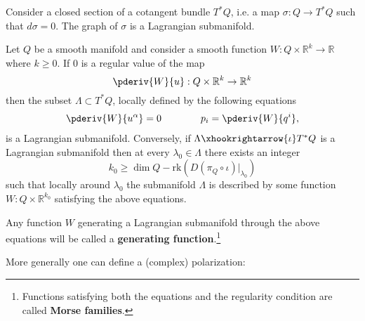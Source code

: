     \begin{example}\label{diff:closed_section_submanifold}
        Consider a closed section of a cotangent bundle $T^*Q$, i.e. a map $\sigma:Q\rightarrow T^*Q$ such that $d\sigma=0$. The graph of $\sigma$ is a Lagrangian submanifold.
    \end{example}

    \begin{theorem}
        Let $Q$ be a smooth manifold and consider a smooth function $W:Q\times\mathbb{R}^k\rightarrow\mathbb{R}$ where $k\geq 0$. If 0 is a regular value of the map \[\pderiv{W}{u}:Q\times\mathbb{R}^k\rightarrow\mathbb{R}^k\] then the subset $\Lambda\subset T^*Q$, locally defined by the following equations
        \begin{gather}
            \pderiv{W}{u^\alpha} = 0\qquad\qquad p_i=\pderiv{W}{q^i},
        \end{gather}
        is a Lagrangian submanifold. Conversely, if $\Lambda\xhookrightarrow{\iota}T^*Q$ is a Lagrangian submanifold then at every $\lambda_0\in\Lambda$ there exists an integer \[k_0\geq\dim Q - \text{rk}\left(D(\pi_Q\circ\iota)|_{\lambda_0}\right)\] such that locally around $\lambda_0$ the submanifold $\Lambda$ is described by some function $W:Q\times\mathbb{R}^{k_0}$ satisfying the above equations.
    \end{theorem}
    Any function $W$ generating a Lagrangian submanifold through the above equations will be called a \textbf{generating function}.\footnote{Functions satisfying both the equations and the regularity condition are called \textbf{Morse families}.}

    More generally one can define a (complex) polarization:

